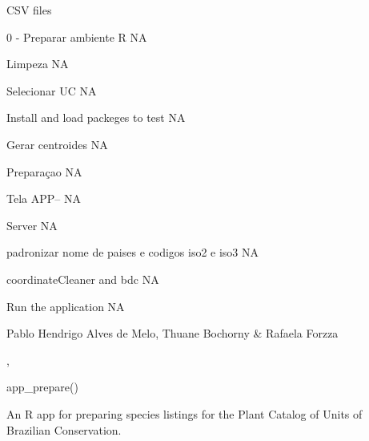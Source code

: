 \documentclass[a4paper]{book}
\begin{document}
%
\begin{Value}
CSV files
\end{Value}
%
\begin{Section}{0 - Preparar ambiente R}
NA
\end{Section}
%
\begin{Section}{Limpeza}
NA
\end{Section}
%
\begin{Section}{Selecionar UC}
NA
\end{Section}
%
\begin{Section}{Install and load packeges to test}
NA
\end{Section}
%
\begin{Section}{Gerar centroides}
NA
\end{Section}
%
\begin{Section}{Preparaçao}
NA
\end{Section}
%
\begin{Section}{Tela APP--}
NA
\end{Section}
%
\begin{Section}{Server}
NA
\end{Section}
%
\begin{Section}{padronizar nome de paises e codigos iso2 e iso3}
NA
\end{Section}
%
\begin{Section}{coordinateCleaner and bdc}
NA
\end{Section}
%
\begin{Section}{Run the application}
NA
\end{Section}
%
\begin{Author}
Pablo Hendrigo Alves de Melo,
Thuane Bochorny \&
Rafaela Forzza
\end{Author}
%
\begin{SeeAlso}
, 
\end{SeeAlso}
%
\begin{Examples}
\begin{ExampleCode}

app_prepare()

\end{ExampleCode}
\end{Examples}
%
\begin{Description}
An R app for preparing species listings for the Plant Catalog of Units of Brazilian Conservation.
\end{Description}
\end{document}
